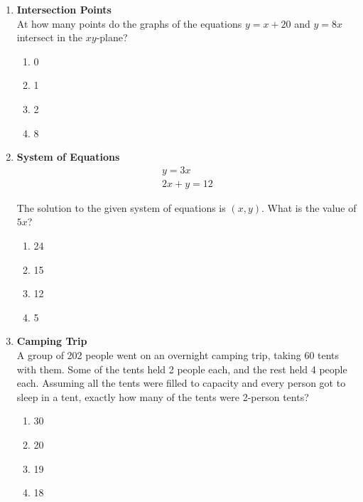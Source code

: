 \begin{enumerate}
\item \textbf{Intersection Points}\\
At how many points do the graphs of the equations $y = x + 20$ and $y = 8x$ intersect in the $xy$-plane?
\begin{enumerate}[label=(\Alph*)]
  \item 0
  \item 1
  \item 2
  \item 8
\end{enumerate}
\begin{subanswer}
\end{subanswer}

\item \textbf{System of Equations}\\
$$
\begin{gathered}
y = 3x \\
2x + y = 12
\end{gathered}
$$

The solution to the given system of equations is $(x, y)$. What is the value of $5x$?
\begin{enumerate}[label=(\Alph*)]
  \item 24
  \item 15
  \item 12
  \item 5
\end{enumerate}
\begin{subanswer}
\end{subanswer}

\item \textbf{Camping Trip}\\
A group of 202 people went on an overnight camping trip, taking 60 tents with them. Some of the tents held 2 people each, and the rest held 4 people each. Assuming all the tents were filled to capacity and every person got to sleep in a tent, exactly how many of the tents were 2-person tents?
\begin{enumerate}[label=(\Alph*)]
  \item 30
  \item 20
  \item 19
  \item 18
\end{enumerate}
\begin{subanswer}
\end{subanswer}

\end{enumerate}









